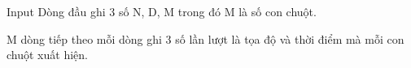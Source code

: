 Input
Dòng đầu ghi 3 số N, D, M trong đó M là số con chuột.  

   M dòng tiếp theo mỗi dòng ghi 3 số lần lượt là tọa độ và thời điểm mà mỗi con chuột xuất hiện.